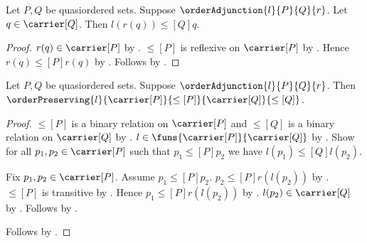 \begin{proposition}\label{order_adjunction_counit}
    Let $P,Q$ be quasiordered sets.
    Suppose $\orderAdjunction{l}{P}{Q}{r}$.
    Let $q\in\carrier[Q]$.
    Then $l(r(q))\mathrel{\leq[Q]}q$.
\end{proposition}
\begin{proof}
    $r(q)\in\carrier[P]$ by
        .
    $\leq[P]$ is reflexive on $\carrier[P]$ by
        .
    Hence $r(q)\mathrel{\leq[P]}r(q)$ by .
    Follows by .
\end{proof}

\begin{proposition}\label{order_adjunction_left_order_preserving}
    Let $P,Q$ be quasiordered sets.
    Suppose $\orderAdjunction{l}{P}{Q}{r}$.
    Then $\orderPreserving{l}{\carrier[P]}{\leq[P]}
        {\carrier[Q]}{\leq[Q]}$.
\end{proposition}
\begin{proof}
    $\leq[P]$ is a binary relation on $\carrier[P]$ and
        $\leq[Q]$ is a binary relation on $\carrier[Q]$ by
        .
    $l\in\funs{\carrier[P]}{\carrier[Q]}$ by
        .
    Show for all $p_1,p_2\in\carrier[P]$ such that
        $p_1\mathrel{\leq[P]}p_2$ we have
        $l(p_1)\mathrel{\leq[Q]}l(p_2)$.
    \begin{subproof}
        Fix $p_1,p_2\in\carrier[P]$.
        Assume $p_1\mathrel{\leq[P]}p_2$.
        $p_2\mathrel{\leq[P]}r(l(p_2))$ by
            .
        $\leq[P]$ is transitive by .
        Hence $p_1\mathrel{\leq[P]}r(l(p_2))$ by
            .
        $l(p_2)\in\carrier[Q]$ by .
        Follows by .
    \end{subproof}
    Follows by .
\end{proof}

